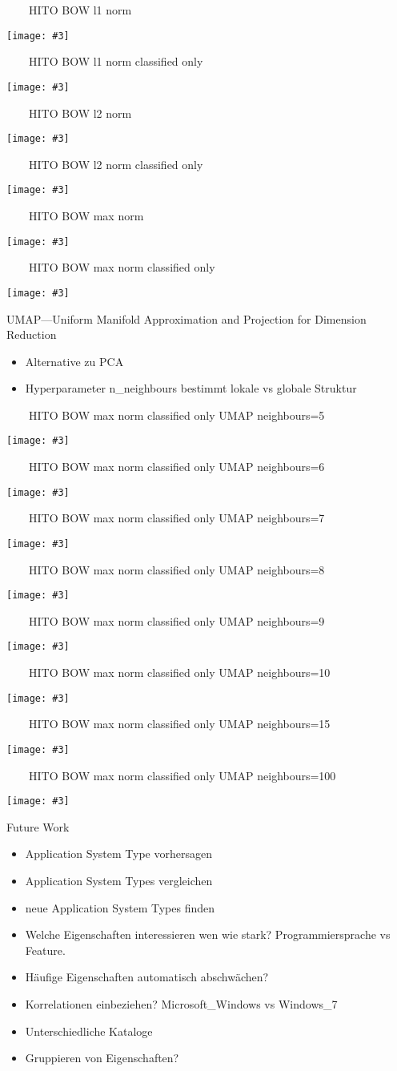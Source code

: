 \documentclass[aspectratio=1610]{beamer}
\newcommand{\imageslide}[4][]
{
\begin{frame}[plain]{~~~~#2}
\vspace{0.2em}
\begin{center}
\centering\texttt{[image: \#3]}
\end{center}
#1
\note{#4}
\end{frame}
}
\begin{document}
\imageslide{HITO BOW l1 norm}{img/cluster-bagofwords-l1.pdf}{}
\imageslide{HITO BOW l1 norm classified only}{img/cluster-bagofwords-classifiedonly-l1.pdf}{}
\imageslide{HITO BOW l2 norm}{img/cluster-bagofwords-l2.pdf}{}
\imageslide{HITO BOW l2 norm classified only}{img/cluster-bagofwords-classifiedonly-l2.pdf}{}
\imageslide{HITO BOW max norm}{img/cluster-bagofwords-max.pdf}{}
\imageslide{HITO BOW max norm classified only}{img/cluster-bagofwords-classifiedonly-max.pdf}{}

\begin{frame}{UMAP---Uniform Manifold Approximation and Projection for Dimension Reduction}
\begin{itemize}
\item Alternative zu PCA
\item Hyperparameter n\_neighbours bestimmt lokale vs globale Struktur
\end{itemize}
\end{frame}

\imageslide{HITO BOW max norm classified only UMAP neighbours=5}{img/cluster-bagofwords-classifiedonly-umap-n5-max.pdf}{}
\imageslide{HITO BOW max norm classified only UMAP neighbours=6}{img/cluster-bagofwords-classifiedonly-umap-n6-max.pdf}{}
\imageslide{HITO BOW max norm classified only UMAP neighbours=7}{img/cluster-bagofwords-classifiedonly-umap-n7-max.pdf}{}
\imageslide{HITO BOW max norm classified only UMAP neighbours=8}{img/cluster-bagofwords-classifiedonly-umap-n8-max.pdf}{}
\imageslide{HITO BOW max norm classified only UMAP neighbours=9}{img/cluster-bagofwords-classifiedonly-umap-n9-max.pdf}{}
\imageslide{HITO BOW max norm classified only UMAP neighbours=10}{img/cluster-bagofwords-classifiedonly-umap-n10-max.pdf}{}
\imageslide{HITO BOW max norm classified only UMAP neighbours=15}{img/cluster-bagofwords-classifiedonly-umap-max.pdf}{}
\imageslide{HITO BOW max norm classified only UMAP neighbours=100}{img/cluster-bagofwords-classifiedonly-umap-n100-max.pdf}{}

\begin{frame}{Future Work}
\begin{itemize}
\item Application System Type vorhersagen
\item Application System Types vergleichen
\item neue Application System Types finden
\pause
\vspace{1em}
\item Welche Eigenschaften interessieren wen wie stark? Programmiersprache vs Feature.
\pause
\item Häufige Eigenschaften automatisch abschwächen?
\pause
\item Korrelationen einbeziehen? Microsoft\_Windows vs Windows\_7
\pause
\item Unterschiedliche Kataloge
\pause
\item Gruppieren von Eigenschaften?
\end{itemize}
\end{frame}
\end{document}
